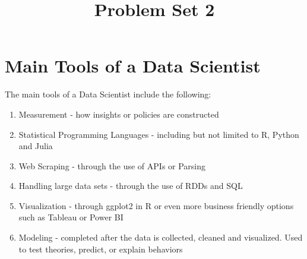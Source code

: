 \documentclass[12pt]{article}
\title{Problem Set 2}
\begin{document}
 
	
	
	\section{Main Tools of a Data Scientist}
	\label{sec_introducao}
	
	The main tools of a Data Scientist include the following:
 
 \begin{enumerate}
     \item Measurement - how insights or policies are constructed
     \item Statistical Programming Languages - including but not limited to R, Python and Julia
     \item Web Scraping - through the use of APIs or Parsing
     \item Handling large data sets - through the use of RDDs and SQL
     \item Visualization - through ggplot2 in R or even more business friendly options such as Tableau or Power BI
     \item Modeling - completed after the data is collected, cleaned and visualized. Used to test theories, predict, or explain behaviors
 \end{enumerate}
	
	
\end{document}
